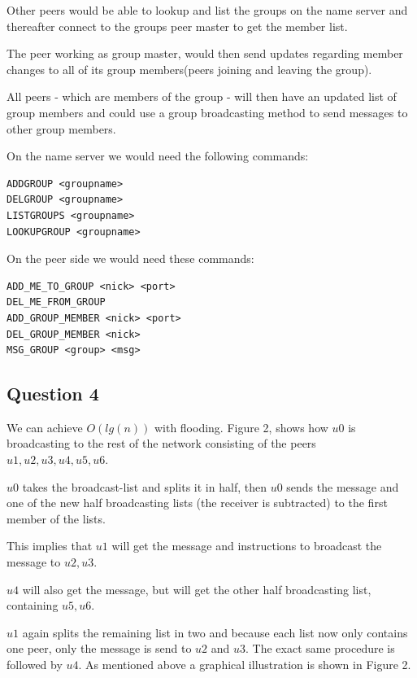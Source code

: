 Other peers would be able to lookup and list the groups on the name server and
thereafter connect to the groups peer master to get the member list.

The peer working as group master, would then send updates regarding
member changes to all of its group members(peers joining and leaving the group).

All peers - which are members of the group - will then have an updated list of
group members and could use a group broadcasting method to send messages to
other group members.

On the name server we would need the following commands:
\begin{lstlisting}
ADDGROUP <groupname>
DELGROUP <groupname>
LISTGROUPS <groupname>
LOOKUPGROUP <groupname>
\end{lstlisting}

On the peer side we would need these commands:
\begin{lstlisting}
ADD_ME_TO_GROUP <nick> <port>
DEL_ME_FROM_GROUP
ADD_GROUP_MEMBER <nick> <port>
DEL_GROUP_MEMBER <nick>
MSG_GROUP <group> <msg>
\end{lstlisting}

\subsection{Question 4}
We can achieve $O(lg(n))$ with flooding. Figure 2, shows how $u0$ is
broadcasting to the rest of the network consisting of the peers
$u1,u2,u3,u4,u5,u6$.

$u0$ takes the broadcast-list and splits it in half, then $u0$ sends the
message and one of the new half broadcasting lists (the receiver
is subtracted) to the first member of the lists.

This implies that $u1$ will get the message and instructions to broadcast the
message to $u2, u3$.

$u4$ will also get the message, but will get the other half broadcasting list,
containing  $u5,u6$.

$u1$ again splits the remaining list in two and because each list now only
contains one peer, only the message is send to $u2$ and $u3$. The exact same
procedure is followed by $u4$. As mentioned above a graphical illustration is
shown in Figure 2.

